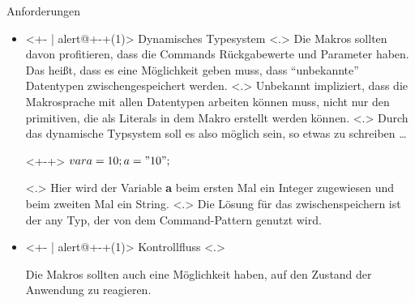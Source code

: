   \begin{frame}{Anforderungen}
    \begin{itemize}
      \item<+- | alert@+-+(1)>
        Dynamisches Typesystem
            \note[item]<.>{
              Die Makros sollten davon profitieren, dass die Commands Rückgabewerte und Parameter haben. Das heißt, dass es eine Möglichkeit geben muss, dass ``unbekannte'' Datentypen zwischengespeichert werden.
            }
            \note[item]<.>{
              Unbekannt impliziert, dass die Makrosprache mit allen Datentypen arbeiten können muss, nicht nur den primitiven, die als Literals in dem Makro erstellt werden können.
            }
            \note[item]<.>{
              Durch das dynamische Typsystem soll es also möglich sein, so etwas zu schreiben \ldots
            }
        \begin{uncoverenv}<+-+>%
          \tabto{4.6cm}
          \myMIn$var a = 10; a = "10";$
        \end{uncoverenv}
            \note[item]<.>{
              Hier wird der Variable \textbf{a} beim ersten Mal ein Integer zugewiesen und beim zweiten Mal ein String.
            }
            \note[item]<.>{
              Die Lösung für das zwischenspeichern ist der any Typ, der von dem Command-Pattern genutzt wird.
            }
      \item<+- | alert@+-+(1)>
        Kontrollfluss
            \note[item]<.>{
              Die Makros sollten auch eine Möglichkeit haben, auf den Zustand der Anwendung zu reagieren.

}
\end{itemize}
\end{frame}
